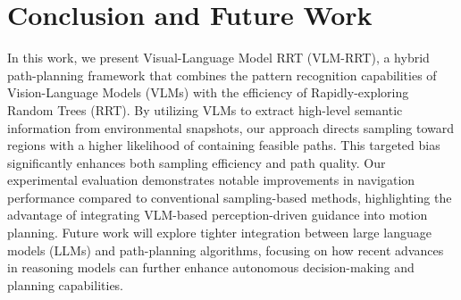 \section{Conclusion and Future Work}
\label{sec:Conclusion}
In this work, we present Visual-Language Model RRT (VLM-RRT), a hybrid path-planning framework that combines the pattern recognition capabilities of Vision-Language Models (VLMs) with the efficiency of Rapidly-exploring Random Trees (RRT). By utilizing VLMs to extract high-level semantic information from environmental snapshots, our approach directs sampling toward regions with a higher likelihood of containing feasible paths. This targeted bias significantly enhances both sampling efficiency and path quality. Our experimental evaluation demonstrates notable improvements in navigation performance compared to conventional sampling-based methods, highlighting the advantage of integrating VLM-based perception-driven guidance into motion planning. Future work will explore tighter integration between large language models (LLMs) and path-planning algorithms, focusing on how recent advances in reasoning models can further enhance autonomous decision-making and planning capabilities.